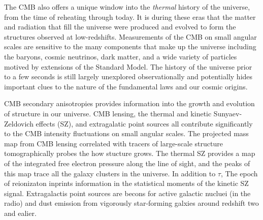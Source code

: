\documentclass[PICOReport.tex]{subfiles}
\begin{document}
The CMB also offers a unique window into the {\it thermal} history of the universe, from the time of reheating through today.  It is during these eras that the matter and radiation that fill the universe were produced and evolved to form the structures observed at low-redshifts.  Measurements of the CMB on small angular scales are sensitive to the many components that make up the universe including the baryons, cosmic neutrinos, dark matter, and a wide variety of particles motived by extensions of the Standard Model.  The history of the universe prior to a few seconds is still largely unexplored observationally and potentially hides important clues to the nature of the fundamental laws and our cosmic origins.


CMB secondary anisotropies provides information into the growth and evolution of structure in our universe. CMB lensing, the thermal and kinetic Sunyaev-Zeldovich effects (SZ), and extragalatic point sources all contribute significantly to the CMB intensity fluctuations on small angular scales. The projected mass map from CMB lensing correlated with tracers of large-scale structure tomographically probes the how stucture grows. The thermal SZ provides a map of the integrated free electron pressure along the line of sight, and the peaks of this map trace all the galaxy clusters in the universe. In addition to $\tau$, The epoch of reionizaton inprints information in the statistical moments of the kinetic SZ signal. Extragalactis point sources are becons for active galactic nucluei (in the radio) and dust emission from vigorously star-forming galxies around redshift two and ealier.
\end{document}
